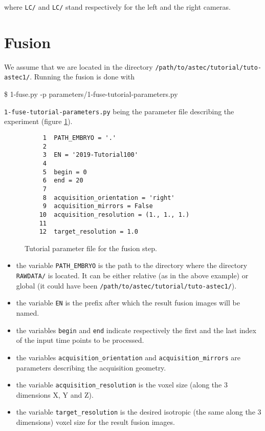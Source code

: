 where \texttt{LC/} and \texttt{LC/} stand respectively for the left
and the right cameras.


\section{Fusion}
\label{sec:tutorial:fusion}

We assume that we are located in the directory
\texttt{/path/to/astec/tutorial/tuto-astec1/}. Running the fusion is
done with
\begin{code}{0.8}
  \$ 1-fuse.py -p parameters/1-fuse-tutorial-parameters.py
\end{code}
\texttt{1-fuse-tutorial-parameters.py} being the parameter file
describing the experiment (figure \ref{fig:tutorial:parameter:fusion}).

\begin{figure}
\begin{framed}
\begin{verbatim}
     1	PATH_EMBRYO = '.'
     2	
     3	EN = '2019-Tutorial100'
     4	
     5	begin = 0
     6	end = 20
     7	
     8	acquisition_orientation = 'right'
     9	acquisition_mirrors = False
    10	acquisition_resolution = (1., 1., 1.)
    11	
    12	target_resolution = 1.0\end{verbatim}
\end{framed}
\caption{\label{fig:tutorial:parameter:fusion} Tutorial parameter file for the fusion step.}
\end{figure}

\begin{itemize}
  \item the variable \texttt{PATH\_EMBRYO} is the path to the directory where
    the directory \texttt{RAWDATA/} is located. It can be either relative (as in the
    above example) or
    global (it could have been \texttt{/path/to/astec/tutorial/tuto-astec1/}).
  \item the variable \texttt{EN} is the prefix after which the result fusion images
    will be named. 
  \item the variables \texttt{begin} and \texttt{end} indicate respectively the
    first and the last index of the input time points to be processed.
  \item the variables \texttt{acquisition\_orientation} and \texttt{acquisition\_mirrors} are parameters
    describing the acquisition geometry.
  \item the variable \texttt{acquisition\_resolution} is the voxel size (along the 3
    dimensions X, Y and Z).
  \item the variable \texttt{target\_resolution} is the desired isotropic (the
    same along the 3 dimensions) voxel size for the result fusion images.
\end{itemize}

